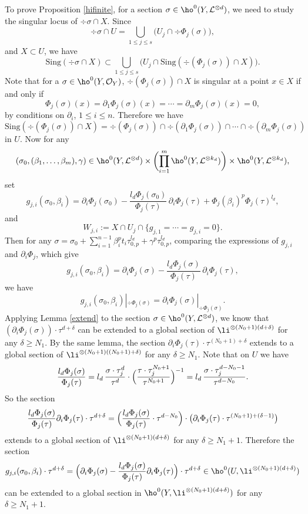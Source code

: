 To prove Proposition \ref{hifinite}, for a section $\sigma\in \ho^0(Y, \mathcal{L}^{\otimes d})$, we need to study the singular locus of $\div \sigma\cap X$. Since
\[
\div \sigma \cap U=\bigcup_{1\leq j\leq s}\bigl(U_j\cap \div \Phi_j(\sigma) \bigr),
\]
and $X\subset U$, we have
\[
\mathrm{Sing}(\div \sigma\cap X)\subset \bigcup_{1\leq j\leq s}\bigl(U_j\cap \mathrm{Sing}(\div (\Phi_j(\sigma))\cap X) \bigr).
\]
Note that for a $\sigma\in \ho^0(Y, \mathcal{O}_Y)$, $\div (\Phi_j(\sigma))\cap X$ is singular at a point $x\in X$ if and only if
\[
\Phi_j(\sigma)(x)=\partial_1\Phi_j(\sigma)(x)=\cdots=\partial_m\Phi_j(\sigma)(x)=0,
\]
by conditions on $\partial_i$, $1\leq i\leq n$. Therefore we have
\[
\mathrm{Sing}(\div (\Phi_j(\sigma))\cap X)=\div (\Phi_j(\sigma))\cap \div (\partial_1\Phi_j(\sigma))\cap\cdots\cap \div (\partial_m\Phi_j(\sigma))
\]
in $U$. Now for any
\[
(\sigma_0, (\beta_1,\dots, \beta_m), \gamma) \in \ho^0(Y,\mathcal{L}^{\otimes d})\times \biggl(\prod_{i=1}^m \ho^0(Y,\mathcal{L}^{\otimes k_d}) \biggr) \times \ho^0(Y, \mathcal{L}^{\otimes k_d}),
\]
set
\[
g_{j,i}(\sigma_0,\beta_i)=\partial_i \Phi_{j}(\sigma_0)-\frac{l_d\Phi_{j}(\sigma_0)}{\Phi_{j}(\tau)}\, \partial_i\Phi_{j}(\tau)+\Phi_{j}(\beta_i)^p\Phi_{j}(\tau)^{l_d},
\]
and
\[
W_{j,i}:=X\cap U_j\cap \{ g_{j,1}=\cdots=g_{j,i}=0 \}.
\]
Then for any $\sigma=\sigma_0+\sum_{i=1}^{n-1} \beta_i^pt_i\tau_{0,p}^{l_d}+\gamma^p\tau_{0,p}^{l_d}$, comparing the expressions of $g_{j,i}$ and $\partial_i\Phi_{j}$, which give
\[
g_{j,i}(\sigma_0,\beta_i)=\partial_i\Phi_{j}(\sigma)-\frac{l_d\Phi_j(\sigma)}{\Phi_j(\tau)}\,\partial_i\Phi_j(\tau),
\]
we have
\[
g_{j,i}(\sigma_0,\beta_i)|_{ \div \Phi_{j}(\sigma)}=\partial_i\Phi_{j}(\sigma)|_{ \div \Phi_{j}(\sigma)}.
\]
Applying Lemma \ref{extend} to the section $\sigma\in \ho^0(Y, \mathcal{L}^{\otimes d})$, we know that $\left(\partial_i \Phi_j(\sigma) \right)\cdot \tau^{d+\delta}$ can be extended to a global section of $\li^{\otimes (N_0+1)(d+\delta)}$ for any $\delta \geq N_1$. By the same lemma, the section $\partial_i\Phi_j(\tau) \cdot \tau^{(N_0+1)+\delta}$ extends to a global section of $\li^{\otimes (N_0+1)((N_0+1)+\delta)}$ for any $\delta \geq N_1$. Note that on $U$ we have
\[
\frac{l_d\Phi_j(\sigma)}{\Phi_j(\tau)}= l_d\,\frac{\sigma \cdot \tau_j^d}{\tau^d} \cdot\Bigl(\frac{\tau \cdot \tau_j^{N_0+1}}{\tau^{N_0+1}}\Bigr)^{-1}=l_d\,\frac{\sigma \cdot \tau_j^{d-N_0-1}}{\tau^{d-N_0}}.
\]
So the section
\[
\frac{l_d\Phi_j(\sigma)}{\Phi_j(\tau)}\partial_i\Phi_j(\tau)\cdot \tau^{d+\delta} = \Bigl(\frac{l_d\Phi_j(\sigma)}{\Phi_j(\tau)}\cdot \tau^{d-N_0}\Bigr)\cdot \bigl(\partial_i\Phi_j(\tau) \cdot \tau^{(N_0+1)+(\delta-1)} \bigr)
\]
extends to a global section of $\li^{\otimes (N_0+1)(d+\delta)}$ for any $\delta \geq N_1+1$.
Therefore the section
\[
g_{j,i}(\sigma_0,\beta_i)\cdot \tau^{d+\delta}=\Bigl(\partial_i\Phi_{j}(\sigma)-\frac{l_d\Phi_j(\sigma)}{\Phi_j(\tau)}\partial_i\Phi_j(\tau)\Bigr)\cdot \tau^{d+\delta}\in \ho^0(U, \li^{\otimes (N_0+1)(d+\delta)})
\]
can be extended to a global section in $\ho^0(Y, \li^{\otimes (N_0+1)(d+\delta)})$ for any $\delta\geq N_1+1$.

